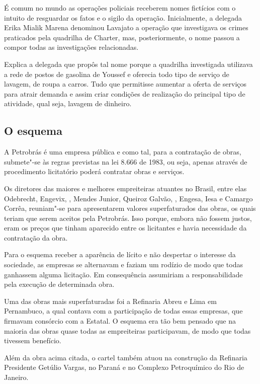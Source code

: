 É comum no mundo as operações policiais receberem nomes fictícios com o
intuito de resguardar os fatos e o sigilo da operação. Inicialmente, a
delegada Erika Mialik Marena denominou Lavajato a operação que
investigava os crimes praticados pela quadrilha de Charter, mas, posteriormente, o
nome passou a compor todas as investigações relacionadas.

Explica a delegada que propôs tal nome porque a quadrilha investigada
utilizava a rede de postos de gasolina de Youssef e oferecia todo tipo
de serviço de lavagem, de roupa a carros. Tudo que permitisse aumentar a
oferta de serviços para atrair demanda e assim criar condições de
realização do principal tipo de atividade, qual seja, lavagem de
dinheiro.

\subsection{O esquema}

A Petrobrás é uma empresa pública e como tal, para a contratação de
obras, submete"-se às regras previstas na lei 8.666 de 1983, ou seja,
apenas através de procedimento licitatório poderá contratar obras e
serviços.

Os diretores das maiores e melhores empreiteiras atuantes no Brasil,
entre elas Odebrecht, Engevix, , Mendes Junior, Queiroz Galvão, ,
Engesa, Iesa e Camargo Corrêa, reuniam"-se para apresentarem valores
superfaturados das obras, os quais teriam que serem aceitos pela
Petrobrás. Isso porque, embora não fossem justos, eram os preços que
tinham aparecido entre os licitantes e havia necessidade da contratação
da obra.

Para o esquema receber a aparência de lícito e não despertar o interesse
da sociedade, as empresas se alternavam e faziam um rodízio de modo que
todas ganhassem alguma licitação. Em consequência assumiriam a
responsabilidade pela execução de determinada obra.

Uma das obras mais superfaturadas foi a Refinaria Abreu e Lima em
Pernambuco, a qual contava com a participação de todas essas empresas,
que firmavam consórcio com a Estatal. O esquema era tão bem pensado que
na maioria das obras quase todas as empreiteiras participavam, de modo
que todas tivessem benefício.

Além da obra acima citada, o cartel também atuou na construção da
Refinaria Presidente Getúlio Vargas, no Paraná e no Complexo
Petroquímico do Rio de Janeiro.

